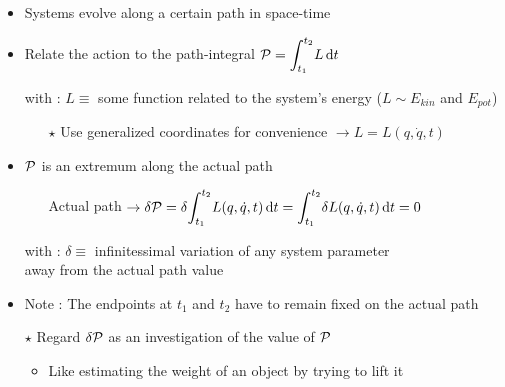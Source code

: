 \Tr
\begin{center}
{\red {}}
\end{center}
%
\begin{itemize}
\item Systems evolve along a certain path in space-time
\item Relate the {\blue action} to the {\blue path-integral} ${\cal P}={\displaystyle \int_{t_{1}}^{t_{2}}} L \,{\rm d}t$
\item[] with : $L \equiv$ some function related to the system's energy ($L \sim E_{kin}$ and $E_{pot}$)
\begin{itemize}
\item[$\star$] Use generalized coordinates for convenience $\rightarrow L=L(q,\dot{q},t)$ 
\end{itemize}
\item {\blue ${\cal P}$ is an extremum along the actual path}
\begin{itemize}
\item[] Actual path $\rightarrow \delta{\cal P}=
  \delta{\displaystyle \int_{t_{1}}^{t_{2}}} L(q,\dot{q},t) \,{\rm d}t=
  {\displaystyle \int_{t_{1}}^{t_{2}}} \delta L(q,\dot{q},t) \,{\rm d}t=0$
\end{itemize}
\item[] with : $\delta \equiv$ infinitessimal variation of any system parameter\\
 \hspace*{35mm} away from the actual path value
\item Note : The endpoints at $t_{1}$ and $t_{2}$ have to remain fixed
             on the actual path
\end{itemize}
\begin{itemize}
\item[$\star$] Regard $\delta {\cal P}$ as an investigation of the
               value of ${\cal P}$
\begin{itemize}
\item Like estimating the weight of an object by trying to lift it
\end{itemize}
\end{itemize}

